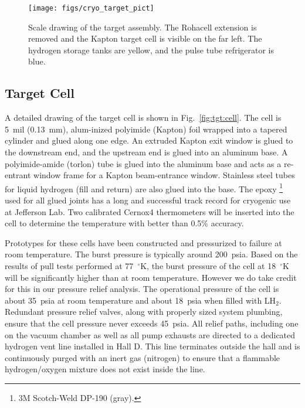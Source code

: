 
\begin{figure}[h]
\begin{center}
      \texttt{[image: figs/cryo\_target\_pict]}
\end{center}
\caption{
Scale drawing of the target assembly.  The Rohacell extension is
removed and the Kapton target cell is visible on the far left.  The
hydrogen storage tanks are yellow, and the pulse tube refrigerator is
blue.
\label{fig:tgt:pict}}
\end{figure}


\subsection[Target Cell]{Target Cell \label{sec:tgt:cell}}

A detailed drawing of the target cell is shown in
Fig.~\ref{fig:tgt:cell}.  The cell is 5~mil (0.13~mm), alum-inized
polyimide (Kapton) foil wrapped into a tapered cylinder and glued
along one edge.  An extruded Kapton exit window is glued to the
downstream end, and the upstream end is glued into an aluminum base.
A polyimide-amide (torlon) tube is glued into the aluminum base and
acts as a re-entrant window frame for a Kapton beam-entrance window.
Stainless steel tubes for liquid hydrogen (fill and return) are also
glued into the base.  The epoxy%
\footnote{3M Scotch-Weld DP-190 (gray).}
used for all
glued joints has a long and successful track record for cryogenic use
at Jefferson Lab.  Two calibrated Cernox4 thermometers will be
inserted into the cell to determine the temperature with better than
0.5\% accuracy.

Prototypes for these cells have been constructed and pressurized to
failure at room temperature.  The burst pressure is typically around
200~psia. Based on the results of pull tests performed at 77~$^\circ$K, the
burst pressure of the cell at 18~$^\circ$K will be significantly higher than
at room temperature.  However we do take credit for this in our
pressure relief analysis.  The operational pressure of the cell is
about 35~psia at room temperature and about 18~psia when filled with
LH$_2$. Redundant pressure relief valves, along with properly sized
system plumbing, ensure that the cell pressure never exceeds 45~psia.
All relief paths, including one on the vacuum chamber as well as all
pump exhausts are directed to a dedicated hydrogen vent line installed
in Hall D.  This line terminates outside the hall and is continuously
purged with an inert gas (nitrogen) to ensure that a flammable
hydrogen/oxygen mixture does not exist inside the line.

